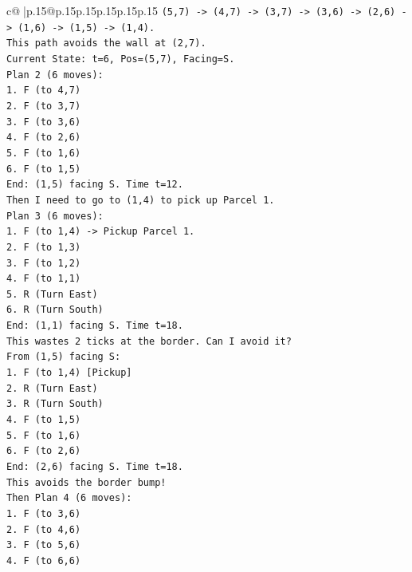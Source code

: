 \documentclass{article}
\begin{document}
{\begin{supertabular}{c@{$\;$}|p{.15\linewidth}@{}p{.15\linewidth}p{.15\linewidth}p{.15\linewidth}p{.15\linewidth}p{.15\linewidth}}
{{{\texttt{(5,7) {-}> (4,7) {-}> (3,7) {-}> (3,6) {-}> (2,6) {-}> (1,6) {-}> (1,5) {-}> (1,4).} \\
\texttt{This path avoids the wall at (2,7).} \\
\texttt{Current State: t=6, Pos=(5,7), Facing=S.} \\
\texttt{Plan 2 (6 moves):} \\
\texttt{1. F (to 4,7)} \\
\texttt{2. F (to 3,7)} \\
\texttt{3. F (to 3,6)} \\
\texttt{4. F (to 2,6)} \\
\texttt{5. F (to 1,6)} \\
\texttt{6. F (to 1,5)} \\
\texttt{End: (1,5) facing S. Time t=12.} \\
\texttt{Then I need to go to (1,4) to pick up Parcel 1.} \\
\texttt{Plan 3 (6 moves):} \\
\texttt{1. F (to 1,4) {-}> Pickup Parcel 1.} \\
\texttt{2. F (to 1,3)} \\
\texttt{3. F (to 1,2)} \\
\texttt{4. F (to 1,1)} \\
\texttt{5. R (Turn East)} \\
\texttt{6. R (Turn South)} \\
\texttt{End: (1,1) facing S. Time t=18.} \\
\texttt{This wastes 2 ticks at the border. Can I avoid it?} \\
\texttt{From (1,5) facing S:} \\
\texttt{1. F (to 1,4) {[}Pickup{]}} \\
\texttt{2. R (Turn East)} \\
\texttt{3. R (Turn South)} \\
\texttt{4. F (to 1,5)} \\
\texttt{5. F (to 1,6)} \\
\texttt{6. F (to 2,6)} \\
\texttt{End: (2,6) facing S. Time t=18.} \\
\texttt{This avoids the border bump!} \\
\texttt{Then Plan 4 (6 moves):} \\
\texttt{1. F (to 3,6)} \\
\texttt{2. F (to 4,6)} \\
\texttt{3. F (to 5,6)} \\
\texttt{4. F (to 6,6)} \\
}}}
\end{supertabular}}
\end{document}
